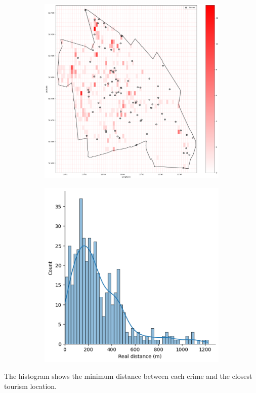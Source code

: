 \begin{figure}[h]
    \centering
    \begin{subfigure}[b]{0.45\textwidth}
        \centering
        \includegraphics[width=\textwidth]{./figures/Gerard/tourism.png}
        \caption{}
        \label{fig:image1}
    \end{subfigure}
    \hfill
    \begin{subfigure}[b]{0.45\textwidth}
        \centering
        \includegraphics[width=\textwidth]{./figures/Gerard/tourism_1.png}
        \caption{}
        \label{fig:image2}
    \end{subfigure}

\end{figure}
The histogram shows the minimum distance between each crime and the closest tourism location. 

